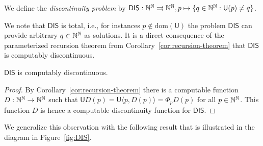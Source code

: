 \documentclass{amsart}
\def\IN{{\Bbb{N}}}
\def\mto{\rightrightarrows}
\def\U{{\mathsf{{U}}}}
\def\dom{{\mathrm{dom}}}
\def\DIS{\mathsf{DIS}}
\begin{document}
\begin{definition}
\label{def:dis}
We define the {\em discontinuity problem} by
$\DIS:\IN^\IN\mto\IN^\IN,p\mapsto\{q\in\IN^\IN:\U(p)\not=q\}$.
\end{definition}

We note that $\DIS$ is total, i.e., for instances $p\not\in\dom(\U)$ the problem $\DIS$ can provide arbitrary $q\in\IN^\IN$
as solutions.
It is a direct consequence of the parameterized recursion theorem from Corollary~\ref{cor:recursion-theorem}
that $\DIS$ is computably discontinuous.

\begin{proposition} 
\label{prop:DIS-computably-discontinuous} 
$\DIS$ is computably discontinuous.
\end{proposition}
\begin{proof}
By Corollary~\ref{cor:recursion-theorem} there is a computable function $D:\IN^\IN\to\IN^\IN$
such that $\U D(p)=\U\langle p,D(p)\rangle=\Phi_pD(p)$ for all $p\in\IN^\IN$. This function $D$ is hence a computable discontinuity function for $\DIS$.
\end{proof}

We generalize this observation with the following result that is illustrated in the diagram in Figure~\ref{fig:DIS}.
\end{document}
